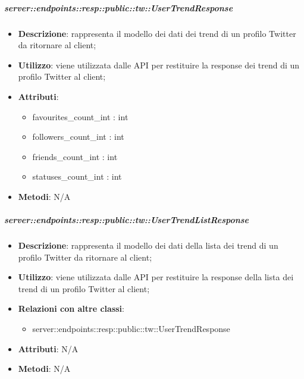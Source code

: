     \subparagraph{server::endpoints::resp::public::tw::UserTrendResponse} %
    \label{subp:bdsm_app_server_endpoints_resp_public_tw_usertrendresponse}
    \begin{itemize}
      \item \textbf{Descrizione}: rappresenta il modello dei dati dei trend di un profilo Twitter da ritornare al client;
      \item \textbf{Utilizzo}: viene utilizzata dalle API per restituire la response dei trend di un profilo Twitter al client;
      
	  \item \textbf{Attributi}:  
	  	\begin{itemize}
	  		\item favourites\_count\_int : int
	  		\item followers\_count\_int : int
	  		\item friends\_count\_int : int
	  		\item statuses\_count\_int : int
	  	\end{itemize}
	  \item \textbf{Metodi}: N/A
    \end{itemize}

    \subparagraph{server::endpoints::resp::public::tw::UserTrendListResponse} %
    \label{subp:bdsm_app_server_endpoints_resp_public_tw_usertrendlistresponse}
    \begin{itemize}
      \item \textbf{Descrizione}: rappresenta il modello dei dati della lista dei trend di un profilo Twitter da ritornare al client;
      \item \textbf{Utilizzo}: viene utilizzata dalle API per restituire la response della lista dei trend di un profilo Twitter al client;
      \item \textbf{Relazioni con altre classi}:
        \begin{itemize}
          \item server::endpoints::resp::public::tw::UserTrendResponse
        \end{itemize}
	  \item \textbf{Attributi}: N/A
	  \item \textbf{Metodi}: N/A
    \end{itemize}

